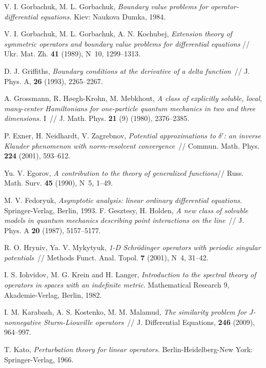 \documentclass[11pt,english]{amsart}
\begin{document}
\begin{thebibliography}{99}
V. I. Gorbachuk, M. L. Gorbachuk, \textit{Boundary value problems for operator-differential equations.} Kiev: Naukova Dumka, 1984.

V. I. Gorbachuk, M. L. Gorbachuk, A. N. Kochubej, \textit{
Extension theory of symmetric operators  and boundary value problems for differential equations} // Ukr. Mat. Zh. \textbf{41} (1989), N~10, 1299--1313.

D. J. Griffiths, \textit{Boundary conditions at the derivative of a delta function}~// J.
Phys. A, \textbf{26} (1993), 2265--2267.

A. Grossmann, R. H{\o}egh-Krohn,  M. Mebkhout,  \textit{A class of
explicitly soluble, local, many-center Hamiltonians for
one-particle quantum mechanics in two and three dimensions. }I~//
J. Math. Phys. \textbf{21} (9) (1980), 2376--2385.

 P. Exner, H. Neidhardt, V. Zagrebnov, \textit{Potential approximations to $\delta'$: an inverse Klauder
phenomenon with norm-resolvent convergence}~// Commun. Math. Phys. \textbf{224} (2001),
593--612.

 Yu. V. Egorov, \textit{A contribution to the theory of generalized functions}// Russ. Math. Surv. \textbf{45} (1990), N~5, 1--49.

 M. V. Fedoryuk,
\textit{Asymptotic analysis: linear ordinary differential equations.} Springer-Verlag, Berlin, 1993.
F. Gesztesy, H. Holden, \textit{A new class of solvable models in quantum mechanics
describing point interactions on the line}~// J. Phys. A \textbf{20} (1987), 5157--5177.

R. O. Hryniv, Ya. V. Mykytyuk, \textit{1-D Schr\"odinger operators with periodic singular
potentials}~// Methods Funct. Anal. Topol. \textbf{7} (2001), N~4, 31--42.

I. S. Iohvidov, M. G. Krein and H. Langer, \textit{Introduction to the spectral theory of
operators in spaces with an indefinite metric}. Mathematical Research 9, Akademie-Verlag,
Berlin, 1982.

I. M. Karabash, A. S. Kostenko, M. M. Malamud, \textit{The similarity problem for
$J$-nonnegative Sturm-Liouville operators}~// J. Differential Equations, \textbf{246}
(2009), 964--997.

T. Kato, \textit{Perturbation theory for linear operators.} Berlin-Heidelberg-New York: Springer-Verlag, 1966.


\end{thebibliography}
\end{document}

